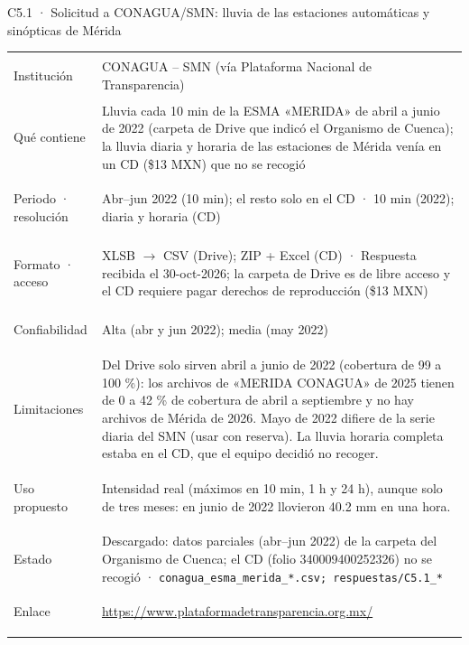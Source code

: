 \documentclass[11pt,a4paper]{article}
\begin{document}
\begin{ficha}{C5.1 · Solicitud a CONAGUA/SMN: lluvia de las estaciones automáticas y sinópticas de Mérida}
\begin{tabularx}{\linewidth}{@{}>{\leavevmode\color{tinta2}\bfseries\raggedright\arraybackslash}p{2.9cm}X@{}}
Institución & CONAGUA – SMN (vía Plataforma Nacional de Transparencia) \\
Qué contiene & Lluvia cada 10 min de la ESMA «MERIDA» de abril a junio de 2022 (carpeta de Drive que indicó el Organismo de Cuenca); la lluvia diaria y horaria de las estaciones de Mérida venía en un CD (\$13 MXN) que no se recogió \\
Periodo · resolución & Abr–jun 2022 (10 min); el resto solo en el CD · 10 min (2022); diaria y horaria (CD) \\
Formato · acceso & XLSB $\rightarrow$ CSV (Drive); ZIP + Excel (CD) · Respuesta recibida el 30-oct-2026; la carpeta de Drive es de libre acceso y el CD requiere pagar derechos de reproducción (\$13 MXN) \\
Confiabilidad & Alta (abr y jun 2022); media (may 2022) \\
Limitaciones & Del Drive solo sirven abril a junio de 2022 (cobertura de 99 a 100 \%): los archivos de «MERIDA CONAGUA» de 2025 tienen de 0 a 42 \% de cobertura de abril a septiembre y no hay archivos de Mérida de 2026. Mayo de 2022 difiere de la serie diaria del SMN (usar con reserva). La lluvia horaria completa estaba en el CD, que el equipo decidió no recoger. \\
Uso propuesto & Intensidad real (máximos en 10 min, 1 h y 24 h), aunque solo de tres meses: en junio de 2022 llovieron 40.2 mm en una hora. \\
Estado & Descargado: datos parciales (abr–jun 2022) de la carpeta del Organismo de Cuenca; el CD (folio 340009400252326) no se recogió · {\small\nolinkurl{conagua_esma_merida_*.csv; respuestas/C5.1_*}} \\
Enlace & \url{https://www.plataformadetransparencia.org.mx/} \\
\end{tabularx}
\end{ficha}
\end{document}
